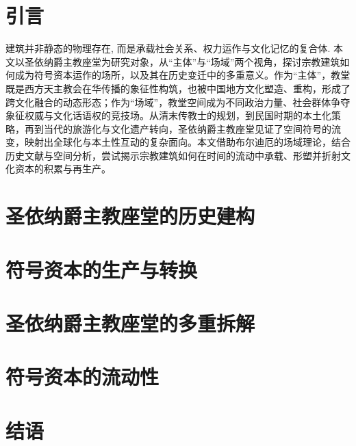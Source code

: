\documentclass[
    lang=cn,
]{spArticle}
\date{}
\begin{document}
    \section{引言}
    建筑并非静态的物理存在, 而是承载社会关系、权力运作与文化记忆的复合体. 本文以圣依纳爵主教座堂为研究对象，从“主体”与“场域”两个视角，探讨宗教建筑如何成为符号资本运作的场所，以及其在历史变迁中的多重意义。作为“主体”，教堂既是西方天主教会在华传播的象征性构筑，也被中国地方文化塑造、重构，形成了跨文化融合的动态形态；作为“场域”，教堂空间成为不同政治力量、社会群体争夺象征权威与文化话语权的竞技场。从清末传教士的规划，到民国时期的本土化策略，再到当代的旅游化与文化遗产转向，圣依纳爵主教座堂见证了空间符号的流变，映射出全球化与本土性互动的复杂面向。本文借助布尔迪厄的场域理论，结合历史文献与空间分析，尝试揭示宗教建筑如何在时间的流动中承载、形塑并折射文化资本的积累与再生产。

    \section{圣依纳爵主教座堂的历史建构}
    \lipsum[2]

    \section{符号资本的生产与转换}
    \lipsum[3]

    \section{圣依纳爵主教座堂的多重拆解}
    \lipsum[4]

    \section{符号资本的流动性}
    \lipsum[5]

    \section{结语}
    \lipsum[6]
\end{document}
